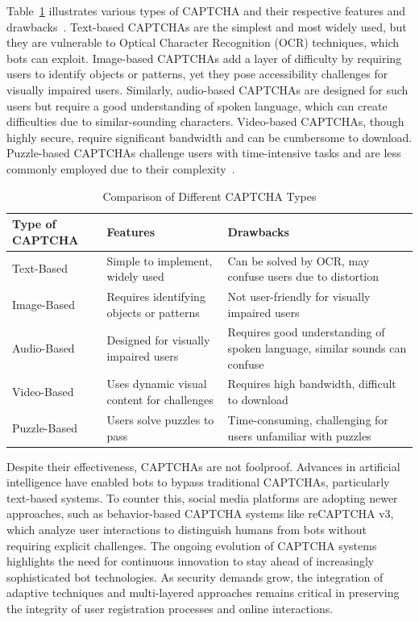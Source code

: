 \documentclass[10pt,twocolumn,twoside,a4paper]{article} %
\begin{document}
Table~\ref{tab:captcha_types} illustrates various types of CAPTCHA and their respective features and drawbacks~\cite{singh2014survey}.
Text-based CAPTCHAs are the simplest and most widely used, but they are vulnerable to Optical Character Recognition (OCR) techniques, which bots can exploit.
Image-based CAPTCHAs add a layer of difficulty by requiring users to identify objects or patterns,
yet they pose accessibility challenges for visually impaired users.
Similarly, audio-based CAPTCHAs are designed for such users but require a good understanding of spoken language,
which can create difficulties due to similar-sounding characters.
Video-based CAPTCHAs, though highly secure, require significant bandwidth and can be cumbersome to download.
Puzzle-based CAPTCHAs challenge users with time-intensive tasks and are less commonly employed due to their complexity~\cite{singh2014survey}.

\begin{table}[t] \label{tab:captcha_comparison}
    \centering
    \caption{Comparison of Different CAPTCHA Types}
    \begin{tabular}{|l|p{}|p{}|}
    \hline
    \textbf{Type of CAPTCHA} & \textbf{Features} & \textbf{Drawbacks} \\ \hline
    Text-Based & Simple to implement, widely used & Can be solved by OCR, may confuse users due to distortion \\ \hline
    Image-Based & Requires identifying objects or patterns & Not user-friendly for visually impaired users \\ \hline
    Audio-Based & Designed for visually impaired users & Requires good understanding of spoken language, similar sounds can confuse \\ \hline
    Video-Based & Uses dynamic visual content for challenges & Requires high bandwidth, difficult to download \\ \hline
    Puzzle-Based & Users solve puzzles to pass & Time-consuming, challenging for users unfamiliar with puzzles \\ \hline
    \end{tabular}
    \label{tab:captcha_types}
\end{table}

Despite their effectiveness, CAPTCHAs are not foolproof.
Advances in artificial intelligence have enabled bots to bypass traditional CAPTCHAs, particularly text-based systems.
To counter this, social media platforms are adopting newer approaches, such as behavior-based CAPTCHA systems like reCAPTCHA v3,
which analyze user interactions to distinguish humans from bots without requiring explicit challenges.
The ongoing evolution of CAPTCHA systems highlights the need for continuous innovation to stay ahead of increasingly sophisticated bot technologies.
As security demands grow, the integration of adaptive techniques and multi-layered approaches remains critical in preserving the integrity of
user registration processes and online interactions.
\end{document}
